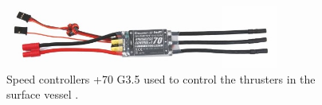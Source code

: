 \begin{figure}[H]
    \includegraphics[width=0.8\textwidth]{figures/ESC}
    \caption{Speed controllers +70 G\num{3,5} used to control the  thrusters in the surface vessel \cite{ESC}.}
    \label{fig:ESC}
\end{figure}

